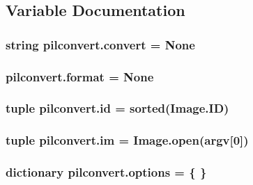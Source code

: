 \subsection{Variable Documentation}
\hypertarget{namespacepilconvert_a73a1889caa10461ddbc5cac320482be3}{
\subsubsection[{convert}]{\setlength{\rightskip}{0pt plus 5cm}string pilconvert.\-convert = None}}\label{namespacepilconvert_a73a1889caa10461ddbc5cac320482be3}
\hypertarget{namespacepilconvert_aeda2abfa8a3605338f6dd7fbe2ce215b}{
\subsubsection[{format}]{\setlength{\rightskip}{0pt plus 5cm}pilconvert.\-format = None}}\label{namespacepilconvert_aeda2abfa8a3605338f6dd7fbe2ce215b}
\hypertarget{namespacepilconvert_a3dfd6085c5ba93f93def53b9f39a415c}{
\subsubsection[{id}]{\setlength{\rightskip}{0pt plus 5cm}tuple pilconvert.\-id = sorted(Image.\-I\-D)}}\label{namespacepilconvert_a3dfd6085c5ba93f93def53b9f39a415c}
\hypertarget{namespacepilconvert_a966146ff73d91d3bb5c24f46d38d4be1}{
\subsubsection[{im}]{\setlength{\rightskip}{0pt plus 5cm}tuple pilconvert.\-im = Image.\-open(argv\mbox{[}0\mbox{]})}}\label{namespacepilconvert_a966146ff73d91d3bb5c24f46d38d4be1}
\hypertarget{namespacepilconvert_af39ce68498becdbdc79fe1f72c95f40c}{
\subsubsection[{options}]{\setlength{\rightskip}{0pt plus 5cm}dictionary pilconvert.\-options = \{ \}}}\label{namespacepilconvert_af39ce68498becdbdc79fe1f72c95f40c}
